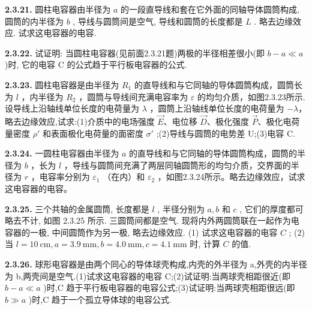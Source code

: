 \textbf{2.3.21.} 圆柱电容器由半径为 $a$ 的一段直导线和套在它外面的同轴导体圆筒构成, 圆筒的内半径为 $b$ , 导线与圆筒间是空气, 导线和圆筒的长度都是 $L$ . 略去边缘效应. 试求这电容器的电容.

\vfill
\newpage

\textbf{2.3.22.} 试证明: 当圆柱电容器(见前面2.3.21题)两极的半径相差很小(即 $b - a \ll a$ )时, 它的电容 C 的公式趋于平行板电容器的公式.

\vfill
\newpage

\textbf{2.3.23.} 圆柱电容器是由半径为 $R_{1}$ 的直导线和与它同轴的导体圆筒构成，圆筒长为 $l$ ，内半径为 $R_{2}$ ，圆筒与导线间充满电容率为 $\varepsilon$ 的均匀介质，如图2.3.23所示.设导线上沿轴线单位长度的电荷量为 $\lambda$ ，圆筒上沿轴线单位长度的电荷量为 $-\lambda$，略去边缘效应,试求:(1)介质中的电场强度 $\vec{E}$、电位移 $\vec{D}$、极化强度 $\vec{P}$、极化电荷量密度 $\rho'$ 和表面极化电荷量的面密度 $\sigma'$ ;(2)导线与圆筒的电势差 U;(3)电容 C.

\vfill
\newpage

\textbf{2.3.24.} 一圆柱电容器由半径为 $a$ 的直导线和与它同轴的导体圆筒构成，圆筒的半径为 $b$ ，长为 $l$ ，导线与圆筒间充满了两层同轴圆筒形的均匀介质，交界面的半径为 $r$ ，电容率分别为 $\varepsilon_{1}$ （在内）和 $\varepsilon_{2}$ ，如图2.3.24所示。略去边缘效应，试求这电容器的电容。

\begin{center}
\end{center}

\vfill
\newpage

\textbf{2.3.25.} 三个共轴的金属圆筒, 长度都是 $l$ , 半径分别为 $a, b$ 和 $c$ , 它们的厚度都可略去不计, 如图 2.3.25 所示. 三圆筒间都是空气. 现将内外两圆筒联在一起作为电容器的一极, 中间圆筒作为另一极, 略去边缘效应. (1) 试求这电容器的电容 $C$ ; (2) 当 $l = 10 \mathrm{~cm}, a = 3.9 \mathrm{~mm}, b = 4.0 \mathrm{~mm}, c = 4.1 \mathrm{~mm}$ 时, 计算 $C$ 的值.

\begin{center}
\end{center}

\vfill
\newpage

\textbf{2.3.26.} 球形电容器是由两个同心的导体球壳构成,内壳的外半径为 a,外壳的内半径为 b,两壳间是空气.(1)试求这电容器的电容 C;(2)试证明:当两球壳相距很近(即 $b-a \ll a$ )时,C 趋于平行板电容器的电容公式;(3)试证明:当两球壳相距很远(即 $b \gg a$ )时,C 趋于一个孤立导体球的电容公式.

